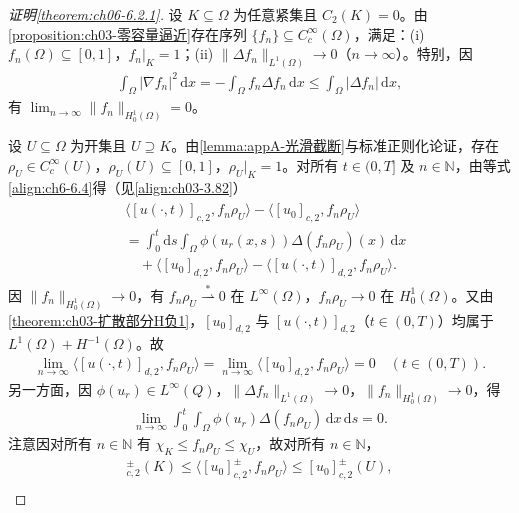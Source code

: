 \documentclass[../../main.tex]{subfiles}%
\begin{document}
\begin{proof}[证明\cref{theorem:ch06-6.2.1}]
设 $K\subseteq\Omega$ 为任意紧集且 $C_2(K)=0$。由\cref{proposition:ch03-零容量逼近}存在序列 $\{f_n\}\subseteq C^\infty_c(\Omega)$，满足：(i) $f_n(\Omega)\subseteq[0,1]$，$f_n|_K=1$；(ii) $\|\Delta f_n\|_{L^1(\Omega)}\to0$（$n\to\infty$）。特别，因
\begin{align*}
\int_\Omega|\nabla f_n|^2\,\mathrm{d}x=-\int_\Omega f_n\Delta f_n\,\mathrm{d}x\leqslant\int_\Omega|\Delta f_n|\,\mathrm{d}x,
\end{align*}
有 $\lim_{n\to\infty}\|f_n\|_{H^1_0(\Omega)}=0$。

设 $U\subseteq\Omega$ 为开集且 $U\supseteq K$。由\cref{lemma:appA-光滑截断}与标准正则化论证，存在 $\rho_U\in C^\infty_c(U)$，$\rho_U(U)\subseteq[0,1]$，$\rho_U|_K=1$。对所有 $t\in(0,T]$ 及 $n\in\mathbb{N}$，由等式\eqref{align:ch6-6.4}得（见\eqref{align:ch03-3.82}）
\begin{align}
\begin{aligned}
&\langle[u(\cdot,t)]_{c,2},f_n\rho_U\rangle-\langle[u_0]_{c,2},f_n\rho_U\rangle\\
&= \int_0^t\mathrm{d}s\int_\Omega\phi(u_r(x,s))\Delta(f_n\rho_U)(x)\,\mathrm{d}x\\
&\quad+\langle[u_0]_{d,2},f_n\rho_U\rangle-\langle[u(\cdot,t)]_{d,2},f_n\rho_U\rangle.
\end{aligned} \label{align:ch6-6.13}
\end{align}
因 $\|f_n\|_{H^1_0(\Omega)}\to0$，有 $f_n\rho_U\stackrel{*}{\rightharpoonup}0$ 在 $L^\infty(\Omega)$，$f_n\rho_U\to0$ 在 $H^1_0(\Omega)$。又由\cref{theorem:ch03-扩散部分H负1}，$[u_0]_{d,2}$ 与 $[u(\cdot,t)]_{d,2}$（$t\in(0,T)$）均属于 $L^1(\Omega)+H^{-1}(\Omega)$。故
\begin{align}
\lim_{n\to\infty}\langle[u(\cdot,t)]_{d,2},f_n\rho_U\rangle
=\lim_{n\to\infty}\langle[u_0]_{d,2},f_n\rho_U\rangle=0
\quad(t\in(0,T)). \label{align:ch6-6.14}
\end{align}
另一方面，因 $\phi(u_r)\in L^\infty(Q)$，$\|\Delta f_n\|_{L^1(\Omega)}\to0$，$\|f_n\|_{H^1_0(\Omega)}\to0$，得
\begin{align}
\lim_{n\to\infty}\int_0^t\int_\Omega\phi(u_r)\Delta(f_n\rho_U)\,\mathrm{d}x\,\mathrm{d}s=0. \label{align:ch6-6.15}
\end{align}
注意因对所有 $n\in\mathbb{N}$ 有 $\chi_K\leqslant f_n\rho_U\leqslant\chi_U$，故对所有 $n\in\mathbb{N}$，
\begin{align}
[u_0]^\pm_{c,2}(K)\leqslant\langle[u_0]^\pm_{c,2},f_n\rho_U\rangle\leqslant[u_0]^\pm_{c,2}(U), \label{align:ch6-6.16a}\\

\end{align}
\end{proof}
\end{document}
